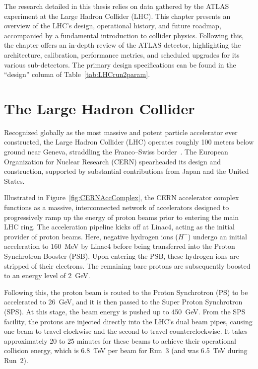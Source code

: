 
The research detailed in this thesis relies on data gathered by the ATLAS experiment at the Large Hadron Collider (LHC). This chapter presents an overview of the LHC's design, operational history, and future roadmap, accompanied by a fundamental introduction to collider physics. Following this, the chapter offers an in-depth review of the ATLAS detector, highlighting the architecture, calibration, performance metrics, and scheduled upgrades for its various sub-detectors. The primary design specifications can be found in the ``design'' column of Table~\ref{tab:LHCrun2param}.

\section{The Large Hadron Collider}

Recognized globally as the most massive and potent particle accelerator ever constructed, the Large Hadron Collider (LHC) operates roughly 100 meters below ground near Geneva, straddling the Franco–Swiss border~\cite{Evans:2008zzb}. The European Organization for Nuclear Research (CERN) spearheaded its design and construction, supported by substantial contributions from Japan and the United States.

Illustrated in Figure~\ref{fig:CERNAccComplex}, the CERN accelerator complex~\cite{CERNAccComplex} functions as a massive, interconnected network of accelerators designed to progressively ramp up the energy of proton beams prior to entering the main LHC ring. The acceleration pipeline kicks off at Linac4, acting as the initial provider of proton beams. Here, negative hydrogen ions ($H^-$) undergo an initial acceleration to 160~MeV by Linac4 before being transferred into the Proton Synchrotron Booster (PSB). Upon entering the PSB, these hydrogen ions are stripped of their electrons. The remaining bare protons are subsequently boosted to an energy level of 2~GeV.

Following this, the proton beam is routed to the Proton Synchrotron (PS) to be accelerated to 26~GeV, and it is then passed to the Super Proton Synchrotron (SPS). At this stage, the beam energy is pushed up to 450~GeV. From the SPS facility, the protons are injected directly into the LHC's dual beam pipes, causing one beam to travel clockwise and the second to travel counterclockwise. It takes approximately 20 to 25 minutes for these beams to achieve their operational collision energy, which is 6.8~TeV per beam for Run~3 (and was 6.5~TeV during Run~2).

